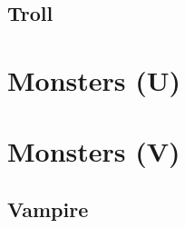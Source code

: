\subsection{Troll}

\FloatBarrier
\section{Monsters (U)} \label{sec:monsters-u}

\FloatBarrier
\section{Monsters (V)} \label{sec:monsters-v}
\subsection{Vampire}
